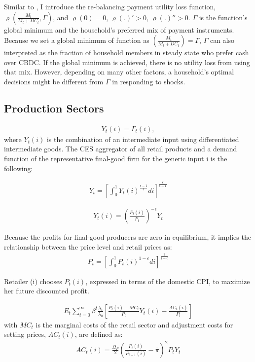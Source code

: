 \documentclass[12pt, a4paper]{article}
\begin{document}
Similar to \cite{minesso2022central}, I introduce the re-balancing payment utility loss function, $\varrho\left(\frac{M_t}{M_t+DC_t},\Gamma\right)$, and  $\varrho(0)=0$,  $\varrho(.)' > 0$,  $\varrho(.)'' > 0$. $\Gamma$ is the function's global minimum and the household’s preferred mix of payment instruments. Because we set a global minimum of function as $\left(\frac{M_t}{M_t+DC_t}\right) = \Gamma$, $\Gamma$ can also interpreted as the fraction of household members in steady state who prefer cash over CBDC. If the global minimum is achieved, there is no utility loss from using that mix. However, depending on many other factors, a household's optimal decisions might be different from $ \Gamma$ in responding to shocks.
\subsection{Production Sectors}
\begin{align}
    Y_{t}(i)=\Gamma_t(i),
\end{align}
where $Y_{t}(i)$ is the combination of an intermediate input using differentiated intermediate goods. The CES aggregator of all retail products and a demand function of the representative final-good firm for the generic input i is the following:

\begin{align}
   Y_{t}=\left[\int_0^1 Y_{t}(i)^{\frac{\epsilon-1}{\epsilon}}di\right]^{\frac{\epsilon}{\epsilon-1}}
\end{align}

\begin{align}
  Y_{t}(i)= \left(\frac{P_{t}(i)}{P_{t}}\right)^{-\epsilon} Y_{t}
\end{align}

Because the profits for final-good producers are zero in equilibrium, it implies the relationship between the price level and retail prices as:
\begin{align}
    P_{t}=\left[\int_0^1P_{t}(i)^{1-\epsilon}di\right]^{\frac{1}{1-\epsilon}}
\end{align}

Retailer (i) chooses $ P_{t}(i)$, expressed in terms of the domestic CPI, to maximize her future discounted profit.

\begin{align}
   E_t{\sum_{t=0}^\infty\beta^t\frac{\lambda_{t}}{\lambda_0}\left[\frac{ P_{t}(i)-MC_{t}}{P_t}Y_{t}(i)-\frac{AC_t(i)}{P_t}\right]}
\end{align}
with $MC_{t}$ is the marginal costs of the retail sector and adjustment costs for setting prices, $AC_t(i)$, are defined as:
\begin{align}
    AC_t(i)=\frac{\Omega_P}{2}\left(\frac{P_{t}(i)}{P_{t-1}(i)} -\bar{\pi}\right)^2 P_{t} Y_{t}
\end{align}
\end{document}
